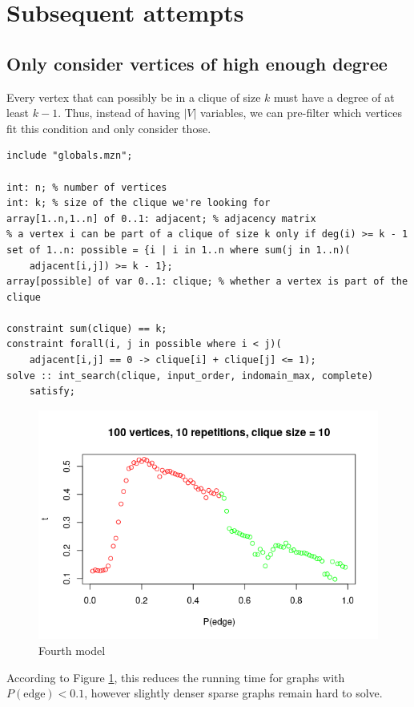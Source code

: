 \documentclass{article}
\begin{document}
\section{Subsequent attempts}
\subsection{Only consider vertices of high enough degree}
Every vertex that can possibly be in a clique of size $k$ must have a degree of at least $k-1$. Thus, instead of having $|V|$ variables, we can pre-filter which vertices fit this condition and only consider those.
\begin{lstlisting}
include "globals.mzn";

int: n; % number of vertices
int: k; % size of the clique we're looking for
array[1..n,1..n] of 0..1: adjacent; % adjacency matrix
% a vertex i can be part of a clique of size k only if deg(i) >= k - 1
set of 1..n: possible = {i | i in 1..n where sum(j in 1..n)(
    adjacent[i,j]) >= k - 1};
array[possible] of var 0..1: clique; % whether a vertex is part of the clique

constraint sum(clique) == k;
constraint forall(i, j in possible where i < j)(
    adjacent[i,j] == 0 -> clique[i] + clique[j] <= 1);
solve :: int_search(clique, input_order, indomain_max, complete)
    satisfy;
\end{lstlisting}
\begin{figure}
  \includegraphics[scale=0.5]{max_clique4.png}
  \caption{Fourth model}
  \label{fig:fourth_max_clique}
\end{figure}
According to Figure \ref{fig:fourth_max_clique}, this reduces the running time for graphs with $P(\text{edge}) < 0.1$, however slightly denser sparse graphs remain hard to solve.
\end{document}

